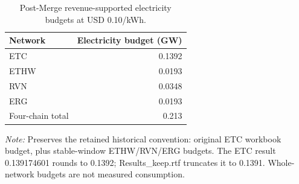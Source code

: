 \begin{table}[htbp]
\centering
\small
\caption{Post-Merge revenue-supported electricity budgets at USD 0.10/kWh.}
\label{tab:postmerge_accounting}
\begin{tabular}{lr}
\toprule
Network & Electricity budget (GW) \\
\midrule
ETC & 0.1392 \\
ETHW & 0.0193 \\
RVN & 0.0348 \\
ERG & 0.0193 \\
Four-chain total & 0.213 \\
\bottomrule
\end{tabular}
\par\smallskip
\begin{minipage}{\linewidth}
\footnotesize
\textit{Note:} Preserves the retained historical convention: original ETC workbook budget, plus stable-window ETHW/RVN/ERG budgets. The ETC result 0.139174601 rounds to 0.1392; Results\_keep.rtf truncates it to 0.1391. Whole-network budgets are not measured consumption.
\end{minipage}
\end{table}
